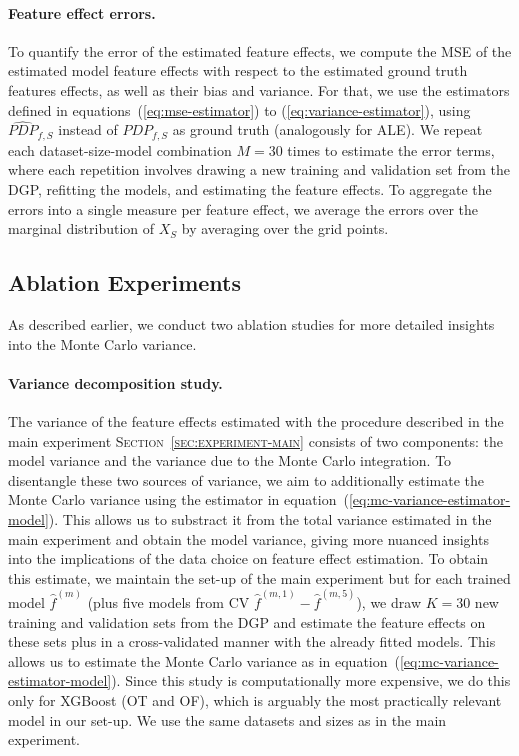 \documentclass[runningheads]{llncs}
\begin{document}
\paragraph{Feature effect errors.} To quantify the error of the estimated feature effects, we compute the MSE of
the estimated model feature effects with respect to the estimated ground truth
features effects, as well as their bias and variance. For that, we use the
estimators defined in equations~(\ref{eq:mse-estimator}) to
(\ref{eq:variance-estimator}), using $\widehat{PDP}_{f,S}$ instead of
$PDP_{f,S}$ as ground truth (analogously for ALE). We repeat each
dataset-size-model combination $M=30$ times to estimate the error terms, where
each repetition involves drawing a new training and validation set from the
DGP, refitting the models, and estimating the feature effects. To aggregate the
errors into a single measure per feature effect, we average the errors over the
marginal distribution of $X_S$ by averaging over the grid points.

\subsection{Ablation Experiments}\label{sec:experiment-ablation}

As described earlier, we conduct two ablation studies for more detailed
insights into the Monte Carlo variance.

\paragraph{Variance decomposition study.} The variance of the feature effects estimated with the procedure described in
the main experiment \textsc{Section~\ref{sec:experiment-main}} consists of two
components: the model variance and the variance due to the Monte Carlo
integration. To disentangle these two sources of variance, we aim to
additionally estimate the Monte Carlo variance using the estimator in
equation~(\ref{eq:mc-variance-estimator-model}). This allows us to substract it
from the total variance estimated in the main experiment and obtain the model
variance, giving more nuanced insights into the implications of the data choice
on feature effect estimation. To obtain this estimate, we maintain the set-up
of the main experiment but for each trained model $\hat f^{(m)}$ (plus five
models from CV $\hat f^{(m,1)} - \hat f^{(m,5)}$), we draw $K=30$ new training
and validation sets from the DGP and estimate the feature effects on these sets
plus in a cross-validated manner with the already fitted models. This allows us
to estimate the Monte Carlo variance as in
equation~(\ref{eq:mc-variance-estimator-model}). Since this study is
computationally more expensive, we do this only for XGBoost (OT and OF), which
is arguably the most practically relevant model in our set-up. We use the same
datasets and sizes as in the main experiment.
\end{document}
